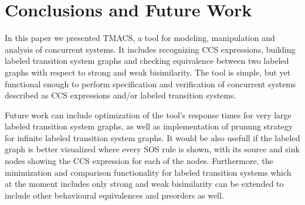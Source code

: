 \section{Conclusions and Future Work}
\label{sec:conclusion}

In this paper we presented TMACS, a tool for modeling, manipulation and analysis of concurrent systems. It includes recognizing CCS expressions, building labeled transition system graphs and checking equivalence between two labeled graphs with respect to strong and weak bisimilarity. The tool is simple, but yet functional enough to perform specification and verification of concurrent systems described as CCS expressions and/or labeled transition systems. 

Future work can include optimization of the tool's response times for very large labeled transition system graphs, as well as implementation of prunung strategy for infinite labeled transition system graphs. It would be also usefull if the labeled graph is better visualized where every SOS rule is shown, with its source and sink nodes showing the CCS expression for each of the nodes. 
Furthermore, the minimization and comparison functionality for labeled transition systems which at the moment includes only strong and weak bisimilarity can be extended to include other behavioural equivalences and preorders as well.
